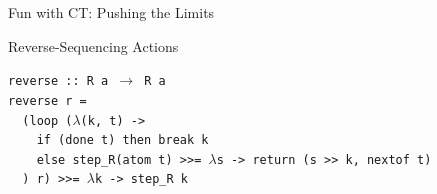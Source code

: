 \documentclass{beamer}
\begin{document}
\begin{frame}{Fun with CT: Pushing the Limits}
\begin{center}
\begin{structure}{Reverse-Sequencing Actions}
\begin{onlinebox}{9cm}
\begin{scriptsize}
\begin{flushleft}
\begin{texttt}
\texttt{reverse :: R a $\rightarrow$ R a\\}
\texttt{reverse r =}\\
\texttt{\ \ (loop ($\lambda$(k, t) ->\\
\ \ \ \ if (done t) then break k\\
\ \ \ \ else step\_R(atom t) >>= $\lambda$s -> return (s >> k, nextof t)}\\
\texttt{\ \ ) r) >>= $\lambda$k -> step\_R k}
\end{texttt}

\end{flushleft}
\end{scriptsize}


\end{onlinebox}
\end{structure}


\end{center}


\end{frame}
\end{document}
